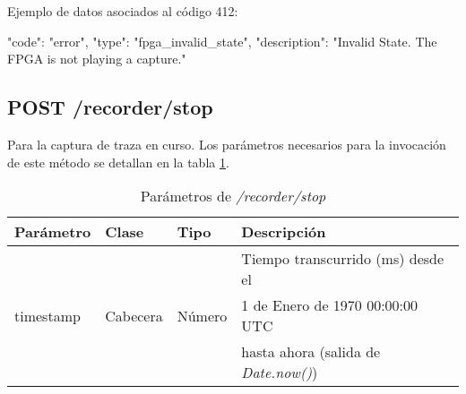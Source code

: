 \begin{itemize}
{\begin{minipage}{\textwidth}
Ejemplo de datos asociados al código 412:

\begin{code}[language=json]
{
  "code": "error",
  "type": "fpga_invalid_state",
  "description": "Invalid State. The FPGA is not playing a capture."
}
\end{code}
\end{minipage}
}

\end{itemize}

%
%
\subsection{POST /recorder/stop}
Para la captura de \gls{traza} en curso. Los parámetros necesarios para la invocación de este método se detallan en la tabla \ref{extra:api:recorderstop:invocacion}.

\begin{table}[H]
\centering
\begin{tabular}{|l|l|l|l|}
\hline
\rowcolor[HTML]{F5F5F5}
\textbf{Parámetro}  & \textbf{Clase} & \textbf{Tipo}   & \textbf{Descripción}                         \\ \hline
                    &                &                 & Tiempo transcurrido (ms) desde el            \\
timestamp           & Cabecera       & Número          & 1 de Enero de 1970 00:00:00 UTC              \\
                    &                &                 & hasta ahora (salida de \textit{Date.now()})  \\ \hline
\end{tabular}
\caption{Parámetros de \textit{/recorder/stop}}
\label{extra:api:recorderstop:invocacion}
\end{table}

